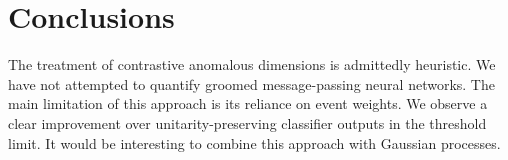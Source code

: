 \section{Conclusions}\label{sec:conclusions}

The treatment of contrastive anomalous dimensions is admittedly
heuristic. We have not attempted to quantify groomed message-passing
neural networks. The main limitation of this approach is its reliance on
event weights. We observe a clear improvement over unitarity-preserving
classifier outputs in the threshold limit. It would be interesting to
combine this approach with Gaussian processes.

